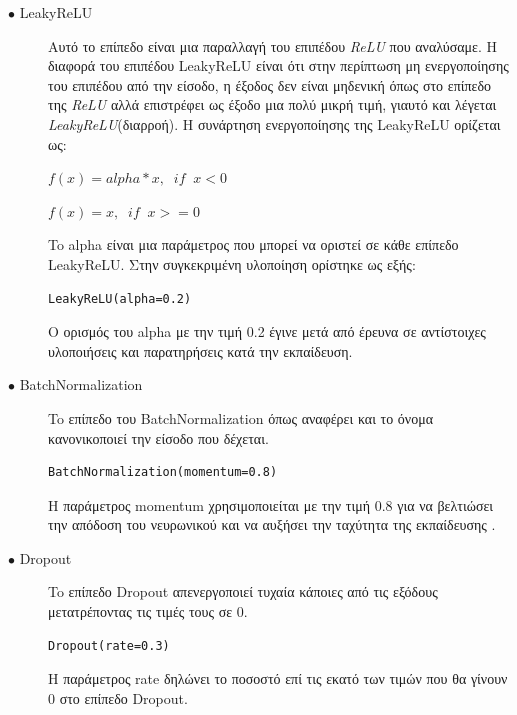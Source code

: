 \begin{description}
\item[$\bullet$ LeakyReLU] Αυτό το επίπεδο είναι μια παραλλαγή του επιπέδου \textit{ReLU} που αναλύσαμε. Η διαφορά  του επιπέδου LeakyReLU είναι ότι στην περίπτωση μη ενεργοποίησης του επιπέδου από την είσοδο, η έξοδος δεν είναι μηδενική όπως στο επίπεδο της \textit{ReLU} αλλά επιστρέφει ως έξοδο μια πολύ μικρή τιμή, γιαυτό και λέγεται \textit{LeakyReLU}(διαρροή). Η συνάρτηση ενεργοποίησης της LeakyReLU ορίζεται ως:
\par
$f(x) = alpha * x,  \;\; if \;\; x < 0$
\par
$f(x) = x,  \;\; if \;\; x >= 0$
\par
To alpha είναι μια παράμετρος που μπορεί να οριστεί σε κάθε επίπεδο LeakyReLU. Στην συγκεκριμένη υλοποίηση ορίστηκε ως εξής:
\begin{verbatim}
LeakyReLU(alpha=0.2)
\end{verbatim}
\par
O ορισμός του alpha με την τιμή 0.2 έγινε μετά από έρευνα σε αντίστοιχες υλοποιήσεις και παρατηρήσεις κατά την εκπαίδευση. \cite{firstgan} \cite{firstgan2} \cite{firstgan3} \cite{leakyrelu}
\end{description}

\begin{description}
\item[$\bullet$ BatchNormalization] To επίπεδο του BatchNormalization όπως αναφέρει και το όνομα κανονικοποιεί την είσοδο που δέχεται. \cite{batch}
\par
\begin{verbatim}
BatchNormalization(momentum=0.8)
\end{verbatim}
\par
Η παράμετρος momentum χρησιμοποιείται με την τιμή 0.8 για να βελτιώσει την απόδοση του νευρωνικού και να αυξήσει την ταχύτητα της εκπαίδευσης \cite{firstgan}.
\end{description}

\begin{description}
\item[$\bullet$ Dropout] To επίπεδο Dropout απενεργοποιεί τυχαία κάποιες από τις εξόδους μετατρέποντας τις τιμές τους σε 0. \cite{dropout}
\par
\begin{verbatim}
Dropout(rate=0.3)
\end{verbatim}
\par
H παράμετρος rate δηλώνει το ποσοστό επί τις εκατό των τιμών που θα γίνουν 0 στο επίπεδο Dropout.
\end{description}

